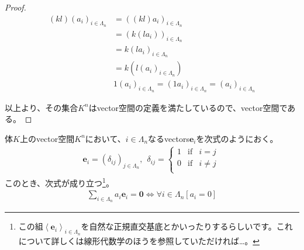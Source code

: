 \documentclass[dvipdfmx]{jsarticle}
\begin{document}
\begin{proof}
\begin{align*}
(kl)\left( a_{i} \right)_{i \in \varLambda_{n}} &= \left( (kl)a_{i} \right)_{i \in \varLambda_{n}}\\
&= \left( k\left( la_{i} \right) \right)_{i \in \varLambda_{n}}\\
&= {k\left( la_{i} \right)}_{i \in \varLambda_{n}}\\
&= k\left( l\left( a_{i} \right)_{i \in \varLambda_{n}} \right)\\
&1\left( a_{i} \right)_{i \in \varLambda_{n}} = \left( 1a_{i} \right)_{i \in \varLambda_{n}} = \left( a_{i} \right)_{i \in \varLambda_{n}}
\end{align*}\par
以上より、その集合$K^{n}$はvector空間の定義を満たしているので、vector空間である。
\end{proof}
\begin{thm}\label{4.1.2.3}
体$K$上のvector空間$K^{n}$において、$i \in \varLambda_{n}$なるvectors$\mathbf{e}_{i}$を次式のようにおく。
\begin{align*}
\mathbf{e}_{i} = \left( \delta_{ij} \right)_{j \in \varLambda_{n}},\ \ \delta_{ij} = \left\{ \begin{matrix}
1 & \mathrm{if} & i = j \\
0 & \mathrm{if} & i \neq j \\
\end{matrix} \right.\ 
\end{align*}
このとき、次式が成り立つ\footnote{この組$\left\langle \mathbf{e}_{i} \right\rangle_{i\in \varLambda_{n} }$を自然な正規直交基底とかいったりするらしいです。これについて詳しくは線形代数学のほうを参照していただければ…。}。
\begin{align*}
\sum_{i \in \varLambda_{n}} {a_{i}\mathbf{e}_{i}} = \mathbf{0} \Leftrightarrow \forall i \in \varLambda_{n}\left[ a_{i} = 0 \right]
\end{align*}
\end{thm}
\end{document}
